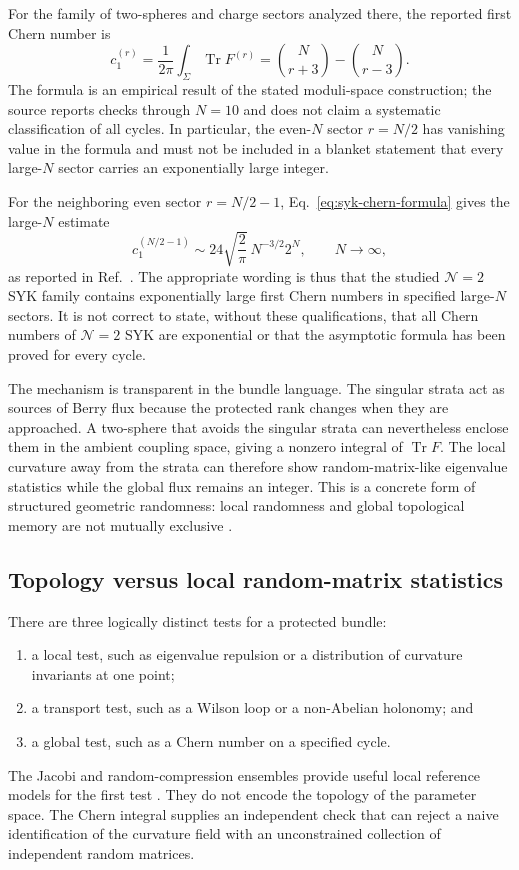 For the family of two-spheres and charge sectors analyzed there, the reported
first Chern number is
\begin{equation}
 c_1^{(r)}
 =\frac{1}{2\pi}\int_{\Sigma}\operatorname{Tr}F^{(r)}
 =\binom{N}{r+3}-\binom{N}{r-3}.
 \label{eq:syk-chern-formula}
\end{equation}
The formula is an empirical result of the stated moduli-space construction;
the source reports checks through $N=10$ and does not claim a systematic
classification of all cycles.  In particular, the even-$N$ sector $r=N/2$
has vanishing value in the formula and must not be included in a blanket
statement that every large-$N$ sector carries an exponentially large integer.

For the neighboring even sector $r=N/2-1$, Eq.~\eqref{eq:syk-chern-formula}
gives the large-$N$ estimate
\begin{equation}
 c_1^{(N/2-1)}
 \sim 24\sqrt{\frac{2}{\pi}}\,N^{-3/2}2^N,
 \qquad N\to\infty,
 \label{eq:syk-chern-asymptotic}
\end{equation}
as reported in Ref.~\cite{chen2026berry}.  The appropriate wording is thus
that the studied $\mathcal{N}=2$ SYK family contains exponentially large first
Chern numbers in specified large-$N$ sectors.  It is not correct to state,
without these qualifications, that all Chern numbers of $\mathcal{N}=2$ SYK are
exponential or that the asymptotic formula has been proved for every cycle.

The mechanism is transparent in the bundle language.  The singular strata
act as sources of Berry flux because the protected rank changes when they are
approached.  A two-sphere that avoids the singular strata can nevertheless
enclose them in the ambient coupling space, giving a nonzero integral of
$\operatorname{Tr}F$.  The local curvature away from the strata can therefore
show random-matrix-like eigenvalue statistics while the global flux remains an
integer.  This is a concrete form of structured geometric randomness: local
randomness and global topological memory are not mutually exclusive
\cite{chen2026berry}.

\subsection{Topology versus local random-matrix statistics}

There are three logically distinct tests for a protected bundle:
\begin{enumerate}
  \item a local test, such as eigenvalue repulsion or a distribution of
  curvature invariants at one point;
  \item a transport test, such as a Wilson loop or a non-Abelian holonomy; and
  \item a global test, such as a Chern number on a specified cycle.
\end{enumerate}
The Jacobi and random-compression ensembles provide useful local reference
models for the first test \cite{collins2005,zyczkowski2000}.  They do not
encode the topology of the parameter space.  The Chern integral supplies an
independent check that can reject a naive identification of the curvature
field with an unconstrained collection of independent random matrices.

